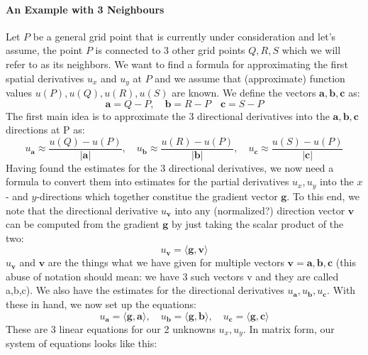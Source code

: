 \paragraph{An Example with 3 Neighbours}
Let $P$ be a general grid point that is currently under consideration and let's assume, the point $P$ is connected to 3 other grid points $Q,R,S$ which we will refer to as its neighbors. We want to find a formula for approximating the first spatial derivatives $u_x$ and $u_y$ at $P$ and we assume that (approximate) function values $u(P),u(Q),u(R),u(S)$ are known. We define the vectors $\mathbf{a,b,c}$ as:
\begin{equation}
\mathbf{a} = Q-P, \quad \mathbf{b} = R-P \quad \mathbf{c} = S-P 
\end{equation}
The first main idea is to approximate the 3 directional derivatives into the $\mathbf{a,b,c}$ directions at P as:
\begin{equation}
 u_{\mathbf{a}} \approx \frac{u(Q)-u(P)}{|\mathbf{a}|}, \quad
 u_{\mathbf{b}} \approx \frac{u(R)-u(P)}{|\mathbf{b}|}, \quad
 u_{\mathbf{c}} \approx \frac{u(S)-u(P)}{|\mathbf{c}|}
\end{equation}
Having found the estimates for the 3 directional derivatives, we now need a formula to convert them into estimates for the partial derivatives $u_x,u_y$ into the $x$- and $y$-directions which together constitue 
the gradient vector $\mathbf{g}$. To this end, we note that the directional derivative $u_\mathbf{v}$ into any (normalized?) direction vector $\mathbf{v}$ can be computed from the gradient $\mathbf{g}$ by just taking the scalar product of the two: 
\begin{equation}
u_\mathbf{v} = \langle \mathbf{g,v} \rangle
\end{equation}
$u_\mathbf{v}$ and $\mathbf{v}$ are the things what we have given for multiple vectors $\mathbf{v = a,b,c}$ (this abuse of notation should mean: we have 3 such vectors v and they are called a,b,c). We also have the
estimates for the directional derivatives $u_\mathbf{a},u_\mathbf{b},u_\mathbf{c}$. With these in hand, we now set up the equations:
\begin{equation}
u_\mathbf{a} = \langle \mathbf{g,a} \rangle, \quad
u_\mathbf{b} = \langle \mathbf{g,b} \rangle, \quad
u_\mathbf{c} = \langle \mathbf{g,c} \rangle
\end{equation}
These are 3 linear equations for our 2 unknowns $u_x,u_y$. In matrix form, our system of equations looks like this:
